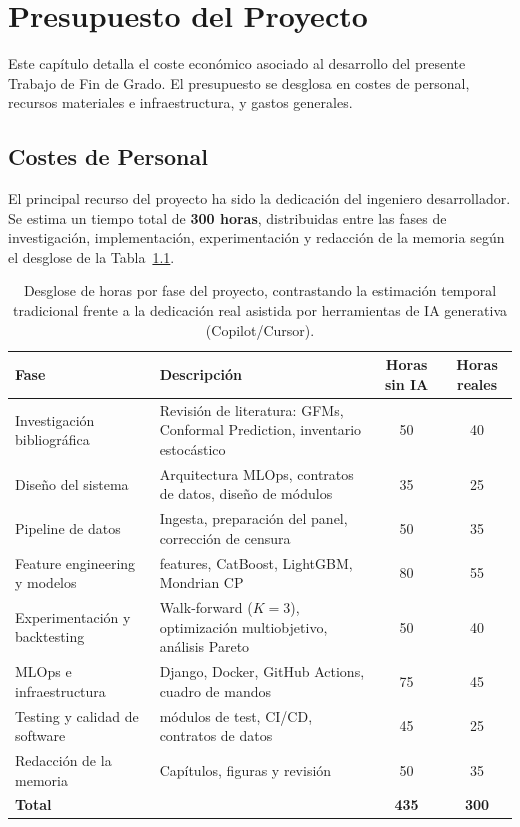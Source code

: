 \chapter{Presupuesto del Proyecto}
\label{chap:presupuesto}

Este capítulo detalla el coste económico asociado al desarrollo del presente Trabajo de Fin de Grado. El presupuesto se desglosa en costes de personal, recursos materiales e infraestructura, y gastos generales.

\section{Costes de Personal}

El principal recurso del proyecto ha sido la dedicación del ingeniero desarrollador. Se estima un tiempo total de \textbf{300 horas}, distribuidas entre las fases de investigación, implementación, experimentación y redacción de la memoria según el desglose de la Tabla~\ref{tab:horas_fases}.

\begin{table}[htbp]
\centering
\small
\begin{tabular}{@{}>{\raggedright\arraybackslash}p{}>{\raggedright\arraybackslash}p{}cc@{}}
\toprule
\textbf{Fase} & \textbf{Descripción} & \textbf{Horas sin IA} & \textbf{Horas reales} \\
\midrule
Investigación bibliográfica & Revisión de literatura: GFMs, Conformal Prediction, inventario estocástico & 50 & 40 \\
Diseño del sistema & Arquitectura MLOps, contratos de datos, diseño de módulos & 35 & 25 \\
Pipeline de datos & Ingesta, preparación del panel, corrección de censura & 50 & 35 \\
Feature engineering y modelos & 43 features, CatBoost, LightGBM, Mondrian CP & 80 & 55 \\
Experimentación y backtesting & Walk-forward ($K=3$), optimización multiobjetivo, análisis Pareto & 50 & 40 \\
MLOps e infraestructura & Django, Docker, GitHub Actions, cuadro de mandos & 75 & 45 \\
Testing y calidad de software & 20 módulos de test, CI/CD, contratos de datos & 45 & 25 \\
Redacción de la memoria & Capítulos, figuras y revisión & 50 & 35 \\
\midrule
\textbf{Total} & & \textbf{435} & \textbf{300} \\
\bottomrule
\end{tabular}
\caption[Horas por fase: estimación frente a dedicación real]{Desglose de horas por fase del proyecto, contrastando la estimación temporal tradicional frente a la dedicación real asistida por herramientas de IA generativa (Copilot\slash Cursor).}
\label{tab:horas_fases}
\end{table}

